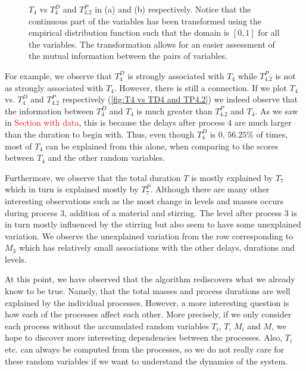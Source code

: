 \documentclass[../Thesis.tex]{subfiles}
\begin{document}
\begin{figure}[H]
\begin{subfigure}[t]{0.49\linewidth}
        \caption{}
    \end{subfigure}
    \caption{$T_4$ vs $T^D_4$ and $T^P_{4.2}$ in (a) and (b) respectively. Notice that the continuous part of the variables has been transformed using the empirical distribution function such that the domain is $[0,1]$ for all the variables. The transformation allows for an easier assessment of the mutual information between the pairs of variables.}
    \label{fig:T4 vs TD4 and TP4.2}
\end{figure}

For example, we observe that $T^D_4$ is strongly associated with $T_4$ while $T^P_{4.2}$ is not as strongly associated with $T_4$. However, there is still a connection. If we plot $T_4$ vs. $T^D_4$ and $T^P_{4.2}$ respectively (\autoref{fig:T4 vs TD4 and TP4.2}) we indeed observe that the information between $T^D_4$ and $T_4$ is much greater than $T^P_{4.2}$ and $T_4$. As we saw in \textcolor{red}{Section with data}, this is because the delays after process $4$ are much larger than the duration to begin with. Thus, even though $T^D_4$ is $0$, $56.25\%$ of times, most of $T_4$ can be explained from this alone, when comparing to the scores between $T_4$ and the other random variables.

Furthermore, we observe that the total duration $T$ is mostly explained by $T_7$ which in turn is explained mostly by $T^P_7$. Although there are many other interesting observations such as the most change in levels and masses occurs during process $3$, addition of a material and stirring. The level after process $3$ is in turn mostly influenced by the stirring but also seem to have some unexplained variation. We observe the unexplained variation from the row corresponding to $M_3$ which has relatively small associations with the other delays, durations and levels.

At this point, we have observed that the algorithm rediscovers what we already know to be true. Namely, that the total masses and process durations are well explained by the individual processes. However, a more interesting question is how each of the processes affect each other. More precisely, if we only consider each process without the accumulated random variables $T_i$, $T$, $M_i$ and $M$, we hope to discover more interesting dependencies between the processes. Also, $T_i$ etc. can always be computed from the processes, so we do not really care for these random variables if we want to understand the dynamics of the system.
\end{document}
